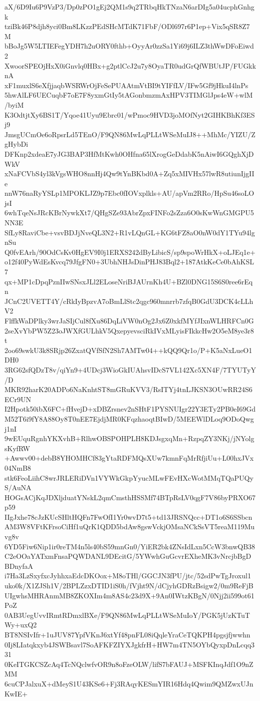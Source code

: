 aX/6D9Iu6P9VzP3/Dp0zPO1gEj2QM1s9q2TRbqHkTNzaN6arDIg5a04ucphGnhgk
tziBk46P8djh8yci0Bm8LKzzPEdSHcMTdK71FbF/ODl697r6P1ep+Vix5qSR8Z7M
bBoJg5W5LTIEFegYDH7h2uORY0fthb+OyyAr0zzSa1Yi69j6ILZ3thWwDFoEiwd2
XwoorSPEOjHxX0iGnvlq0HBx+g2ptlCcJ2u7y8OyaTR0udGrQfWBUtJP/FUGkknA
xF1muxlS6eXfjjaqbWSRWrOjFeSePUAAtmVtBI9tYIFfLV/IFw5Gf9jHkuI4lnPs
5hwAlLF6UECuqbF7oE7F8yxmGtIy5tAGonbmzmAxHPV3TIMGlJps4eW+wlM/byiM
K3OdtjtXy6BS1T/Yqoe41Uyu9Ebrc01/wPmoc9HVD3joMOfNyt2GIHKBhKf3ESj9
JmsgUCmOe6oRpsrLd5TEnO/F9QN86MwLqPLLtWSeMuIJ8++MhMc/YIZU/ZgHybDi
DFKnp2xdeaE7yJG3BAP3HfMtKwh0OHfna65lXrogGeDdabK5nAiwI6GQghXjDWkV
xNaFCVbS4yl3kVgsWHO8nnHj4Qw9tYnBKbd0A+Zq5xMIVHx57lwR8utiunIjgIIe
nnW76naRyYSLp1MPOKLJZ9p7Ebc0fIOVxplkls+AU/apVm2RRo/HpSu46soLOjsI
6whTqeNsJRcKBrNywkXt7/QHgSZe93AbrZpxFINFo2sZza6O0sKwWnGMGPU5NN3E
SfLy8RaviCbe+vsvBDJjNveQL3N2+R1vLQnGL+KG6tFZ8aO0nW0dY1TYu94lgnSu
Q0fvEArh/90OdCsKv0HgEV9I0j1ERXS242dByLibicS/sp9spoWrHkX+oLJEq1e+
o12f40PyWdEsKvcq79JfgFN0+3UbhNHJsDinPHJ83Bql2+187AtkKeCe0bAhKSL7
qx+MP1cDpqPznIIwSNsxJLl2ELoseNriBJAUrnKh4U+BZl0DNG15S6S0ree6rEqn
JCnC2UVETT4Y/cRkIyBpzvA7oBmLlStc2qgc960mnrrb7zfqB0GdU3DCK4cLLhV2
FlffkWaDPlky3wrJaSIjCul8fXu86DqLiVW0nOg2Jx6Z0xkfMYfJIxnWLHRFCn0G
2seXvYbPW5Z23oJWXfGULhkV5QxepyevsciRkIVxMLyisFIkkcHw2O5eM8ye3r8t
2oo69swkU3k8SRjp26ZxatQVfSfN2Sh7AMTw04++kQQ9Qr1o/P+K5aNxLueO1DH0
3RG62sfQDzT8v/qiYn9+4UDcj3WioGkIUAhsvIDcS7VL142Xc5XN4F/7TYUTyY/D
MKR92harK20ADPo6NaKnhtST8mGRuKVV3/RsITYj4tnLJKSN3OUwRR24S6ECr9UN
I2Hpotk50ibX6FC+fHvejD+xDBZrsnev2nSHtF1PYSNUIgr22Y3ETy2PB0eI69Gd
M52T6i9fY8A88Oy8T0nEE7EjdjMR0KFqzhaoqtBIwD/5MEEWlDLoq9ODoQwgj1nI
9wEUquRgnhYKXvhB+RlhwOBSPOHPLH8KDJsgxqMn+RzpqZY3NKj/jNYolgsKyfRW
+Awwv00+debB8YHOMHCf83gYtaRDFMQsXUw7kmnFqMrRfjiUu+L00hxJVx04NmB8
stk6FeoLiihC8wrJRLERiDVn1VYWkGkpYyucMLwFEvHXcWotMMqTQaPUQyS/AuNA
HOGsACjKqJDXljduatYNskL2qmCmsthHSSMf74BTpRsLV0qgF7V86byPRXO67p59
IIgJxhe78cJzKUcSHltHQFn7FwOfI1Yr0wvD7t5+td13JRSNQcc+DT1o6S6SSbcn
AM3W8VFtKFrsoCiHf1uQrK1QDD5bdAw8gswVckjOMsaNCkSsVT5reaM119Muvg8v
6YD5Fiw6Nip1ir0reTM4n5ls40bS59mnGn0/YiER2bk4ZNsIdLxn5CcW3bnwQB38
C2eOOaYATxmFnsaPQWDANL9DEcitG/5YWwhGuGcvrEXheMK3vNrcjbBgDBDnyfaA
i7Ha3LzSxyfxcJyhhxaEdcDKOox+M8oTHl/GGCJN3fPU/jtc/52sdPwTgJroxul1
uko0k/X1ZJSh1V/2BPLZzxDTID1iS0h/fVjht9N/dCjyhGDRzBsigw2/0m9ReFjB
UIgwhsMHRAnmMB8ZKOXIm4m8AS4c23d9X+9An0IWtzKBgN/0Njj2ii599ot61PoZ
0AB3UegUvvIRmtRDmxlBXe/F9QN86MwLqPLLtWSeMuIoY/PGK5jUzKTuTWy+uxQ2
BT8NSIvIfr+1uJUV87YpfVKnJ6xtYf48pnFL08iQqleYraCeTQKPH4pgsjfjwwhn
0Ij8LIatqkxyb4JSWBsavl7SoAFKFZIYXJgkfrH+HW7m4TN5OYbQyxpDnLcqq331
0KeITGKCSZcAq4TcNQclwfvOR9n8oFzeOLW/lifS7bFAUJ+MSFKInqJdf1O9nZMM
6cuCPJalxuX+dMeyS1U43KSe6+Fj3RAqyKESmYIR16Hdq4Qwim9QMZwxUJnKwIE+
